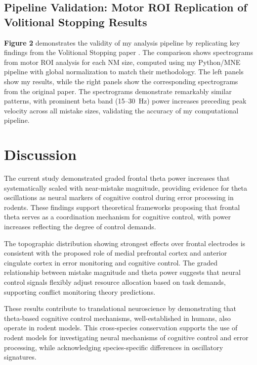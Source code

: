 \documentclass[11pt]{article}
\begin{document}
\subsection{Pipeline Validation: Motor ROI Replication of Volitional Stopping Results}

\textbf{Figure 2} demonstrates the validity of my analysis pipeline by replicating key findings from the Volitional Stopping paper \citep{doutel2024volitional}. The comparison shows spectrograms from motor ROI analysis for each NM size, computed using my Python/MNE pipeline with global normalization to match their methodology. The left panels show my results, while the right panels show the corresponding spectrograms from the original paper. The spectrograms demonstrate remarkably similar patterns, with prominent beta band (15--30~Hz) power increases preceding peak velocity across all mistake sizes, validating the accuracy of my computational pipeline.

\section{Discussion}

The current study demonstrated graded frontal theta power increases that systematically scaled with near-mistake magnitude, providing evidence for theta oscillations as neural markers of cognitive control during error processing in rodents. These findings support theoretical frameworks proposing that frontal theta serves as a coordination mechanism for cognitive control, with power increases reflecting the degree of control demands.

The topographic distribution showing strongest effects over frontal electrodes is consistent with the proposed role of medial prefrontal cortex and anterior cingulate cortex in error monitoring and cognitive control. The graded relationship between mistake magnitude and theta power suggests that neural control signals flexibly adjust resource allocation based on task demands, supporting conflict monitoring theory predictions.

These results contribute to translational neuroscience by demonstrating that theta-based cognitive control mechanisms, well-established in humans, also operate in rodent models. This cross-species conservation supports the use of rodent models for investigating neural mechanisms of cognitive control and error processing, while acknowledging species-specific differences in oscillatory signatures.
\end{document}
